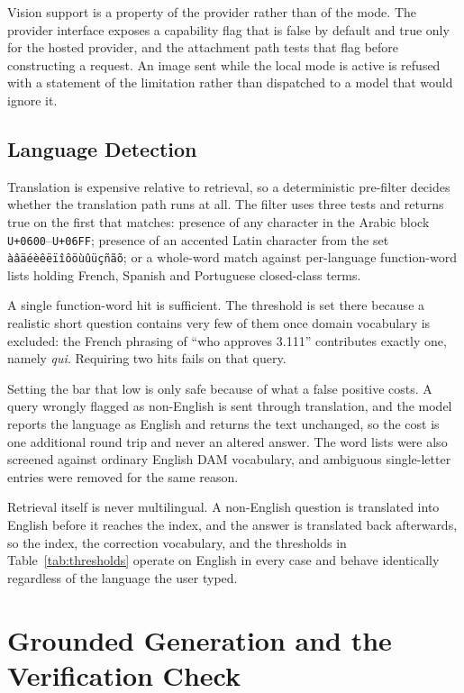 Vision support is a property of the provider rather than of the mode. The provider interface
exposes a capability flag that is false by default and true only for the hosted provider, and
the attachment path tests that flag before constructing a request. An image sent while the
local mode is active is refused with a statement of the limitation rather than dispatched to
a model that would ignore it.

\subsection{Language Detection}
\label{sec:langdetect}

Translation is expensive relative to retrieval, so a deterministic pre-filter decides whether
the translation path runs at all. The filter uses three tests and returns true on the first
that matches: presence of any character in the Arabic block \texttt{U+0600}--\texttt{U+06FF};
presence of an accented Latin character from the set
\texttt{àâäéèêëïîôöùûüçñãõ}; or a whole-word match against per-language function-word lists
holding French, Spanish and Portuguese closed-class terms.

A single function-word hit is sufficient. The threshold is set there because a realistic
short question contains very few of them once domain vocabulary is excluded: the French
phrasing of ``who approves 3.111'' contributes exactly one, namely \emph{qui}. Requiring two
hits fails on that query.

Setting the bar that low is only safe because of what a false positive costs. A query wrongly
flagged as non-English is sent through translation, and the model reports the language as
English and returns the text unchanged, so the cost is one additional round trip and never an
altered answer. The word lists were also screened against ordinary English DAM vocabulary,
and ambiguous single-letter entries were removed for the same reason.

Retrieval itself is never multilingual. A non-English question is translated into English
before it reaches the index, and the answer is translated back afterwards, so the index, the
correction vocabulary, and the thresholds in Table~\ref{tab:thresholds} operate on English in
every case and behave identically regardless of the language the user typed.

\section{Grounded Generation and the Verification Check}

